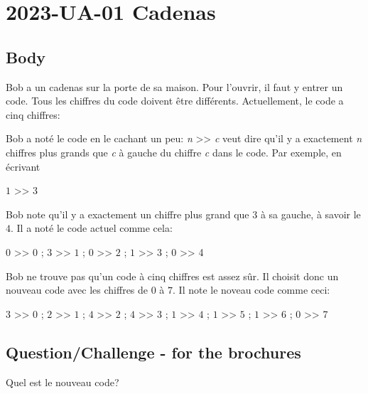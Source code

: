 \documentclass[a4paper,11pt]{report}
\newcommand{\taskGraphicsFolder}{..}
\begin{document}
\section*{\centering{} 2023-UA-01 Cadenas}


\subsection*{Body}

Bob a un cadenas sur la porte de sa maison. Pour l’ouvrir, il faut y entrer un code. Tous les chiffres du code doivent être différents. Actuellement, le code a cinq chiffres:

{\centering%
\par}

Bob a noté le code en le cachant un peu: \emph{n} >\textcompwordmark{}> \emph{c} veut dire qu’il y a exactement \emph{n} chiffres plus grands que \emph{c} à gauche du chiffre \emph{c} dans le code. Par exemple, en écrivant

$1$ >\textcompwordmark{}> 3

Bob note qu’il y a exactement un chiffre plus grand que $3$ à sa gauche, à savoir le $4$. Il a noté le code actuel comme cela:

$0$ >\textcompwordmark{}> $0$ ; $3$ >\textcompwordmark{}> $1$ ; $0$ >\textcompwordmark{}> $2$ ; $1$ >\textcompwordmark{}> $3$ ; $0$ >\textcompwordmark{}> 4

Bob ne trouve pas qu’un code à cinq chiffres est assez sûr. Il choisit donc un nouveau code avec les chiffres de $0$ à $7$. Il note le noveau code comme ceci:

$3$ >\textcompwordmark{}> $0$ ; $2$ >\textcompwordmark{}> $1$ ; $4$ >\textcompwordmark{}> $2$ ; $4$ >\textcompwordmark{}> $3$ ; $1$ >\textcompwordmark{}> $4$ ; $1$ >\textcompwordmark{}> $5$ ; $1$ >\textcompwordmark{}> $6$ ; $0$ >\textcompwordmark{}> 7

{\em


\subsection*{Question/Challenge - for the brochures}

Quel est le nouveau code?

{\centering%
\par}

}
\end{document}
